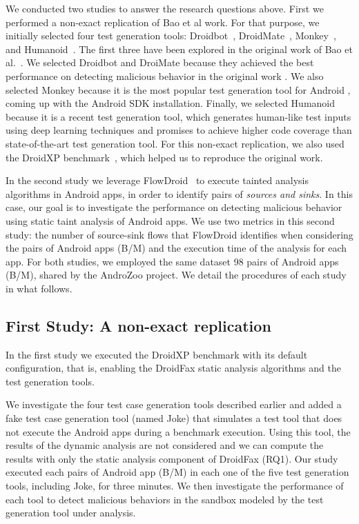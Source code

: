 We conducted two studies to answer the research questions above. First we performed a non-exact replication of Bao et al work.
For that purpose, we initially selected four test generation tools: Droidbot~\cite{DBLP:conf/icse/LiYGC17},
DroidMate~\cite{DBLP:conf/icse/JamrozikZ16}, Monkey~\cite{Monkey}, and Humanoid~\cite{DBLP:conf/kbse/LiY0C19}. The first three have
been explored in the original work of Bao et al.~\cite{DBLP:conf/icse/JamrozikZ16}. We selected Droidbot and DroiMate because they achieved
the best performance on detecting malicious behavior in the original work . We also selected Monkey because it is the most popular test
generation tool for Android , coming up with the Android SDK installation. Finally, we selected Humanoid  because it is a recent test generation tool,
which generates human-like test inputs using deep learning techniques and promises to achieve higher code coverage
than state-of-the-art test generation tool. 
For this non-exact replication, we also used the DroidXP benchmark~\cite{DBLP:conf/scam/CostaMCMVBC20},
which helped us to reproduce the original work.

In the second study we leverage FlowDroid~\cite{DBLP:conf/pldi/ArztRFBBKTOM14} to execute
tainted analysis algorithms in Android apps, in order to identify pairs of \emph{sources and sinks}. In this case,
our goal is to investigate the performance on detecting malicious
behavior using static taint analysis of Android apps. We use two metrics in this second study: the number
of source-sink flows that FlowDroid identifies when considering the pairs of Android apps (B/M) and the
execution time of the analysis for each app.
For both studies, we employed the same dataset 98 pairs of Android apps (B/M),
shared by the AndroZoo \cite{DBLP:conf/msr/AllixBKT16} project. We detail the procedures of each study in what follows.

\subsection{First Study: A non-exact replication}

In the first study we executed the DroidXP benchmark with its
default configuration, that is, enabling the DroidFax
static analysis algorithms and the test generation tools.

We investigate the four test case generation tools described earlier and added a fake test
case generation tool (named Joke) that simulates a test tool that does not execute
the Android apps during a benchmark execution. Using this tool, the results
of the dynamic analysis are not considered and we can compute the results with
only the static analysis component of DroidFax (RQ1). Our study executed each pairs of
Android app (B/M) in each one of the five test generation tools, including Joke,
for three minutes. We then investigate the performance of each tool to detect
malicious behaviors in the sandbox modeled by the test generation tool
under analysis.

